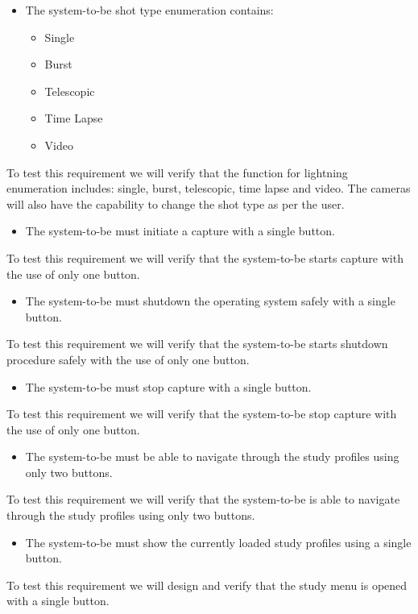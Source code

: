 \begin{itemize}
    \item The system-to-be shot type enumeration contains:
	      \begin{itemize}
		      \item Single
		      \item Burst
		      \item Telescopic
		      \item Time Lapse
		      \item Video
	      \end{itemize}
\end{itemize}
To test this requirement we will verify that the function for lightning enumeration includes: single, burst, telescopic, time lapse and video. The cameras will also have the capability to change the shot type as per the user.
\begin{itemize}
    \item The system-to-be must initiate a capture with a single button.
\end{itemize}
To test this requirement we will verify that the system-to-be starts capture with the use of only one button.
\begin{itemize}
    \item The system-to-be must shutdown the operating system safely with a single button.
\end{itemize}
To test this requirement we will verify that the system-to-be starts shutdown procedure safely with the use of only one button.
\begin{itemize}
    \item The system-to-be must stop capture with a single button.
\end{itemize}
To test this requirement we will verify that the system-to-be stop capture with the use of only one button.
\begin{itemize}
   \item The system-to-be must be able to navigate through the study profiles using only two buttons.
\end{itemize}
To test this requirement we will verify that the system-to-be is able to navigate through the study profiles using only two buttons.
\begin{itemize}
	\item The system-to-be must show the currently loaded study profiles using a single button.
\end{itemize}
To test this requirement we will design and verify that the study menu is opened with a single button.
